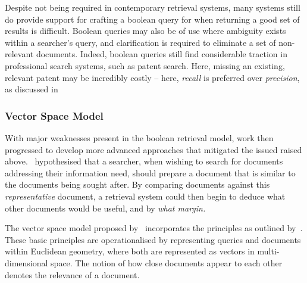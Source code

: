 Despite not being required in contemporary retrieval systems, many systems still do provide support for crafting a boolean query for when returning a good set of results is difficult. Boolean queries may also be of use where ambiguity exists within a searcher's query, and clarification is required to eliminate a set of non-relevant documents. Indeed, boolean queries still find considerable traction in professional search systems, such as patent search. Here, missing an existing, relevant patent may be incredibly costly -- here, \emph{recall} is preferred over \emph{precision}, as discussed in 

\subsubsection{Vector Space Model}
With major weaknesses present in the boolean retrieval model, work then progressed to develop more advanced approaches that mitigated the issued raised above.~\cite{luhn1957ranking_query} hypothesised that a searcher, when wishing to search for documents addressing their information need, should prepare a document that is similar to the documents being sought after. By comparing documents against this \emph{representative} document, a retrieval system could then begin to deduce what other documents would be useful, and by \emph{what margin.}

The vector space model proposed by~\cite{salton1975vsm} incorporates the principles as outlined by~\cite{luhn1957ranking_query}. These basic principles are operationalised by representing queries and documents within Euclidean geometry, where both are represented as vectors in multi-dimensional space. The notion of how close documents appear to each other denotes the relevance of a document.

